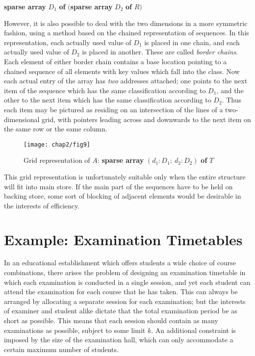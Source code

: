 \quad \textbf{sparse array} $D_1$ \textbf{of} $($\textbf{sparse array} $D_2$ \textbf{of} $R)$

However, it is also possible to deal with the two dimensions in a more symmetric fashion, using a method based on the chained representation of sequences. In this representation, each actually used value of $D_1$ is placed in one chain, and each actually used value of $D_2$ is placed in another. These are called \textit{border chains}. Each element of either border chain contains a base location pointing to a chained sequence of all elements with key values which fall into the class. Now each actual entry of the array has \textit{two} addresses attached; one points to the next item of the sequence which has the same classification according to $D_1$, and the other to the next item which has the same classification according to $D_2$. Thus each item may be pictured as residing on an intersection of the lines of a two-dimensional grid, with pointers leading across and downwards to the next item on the same row or the same column.

\begin{figure}[h]
	\centering
	\texttt{[image: chap2/fig9]}
	\caption{Grid representation of $A$: \textbf{sparse array} $(d_1: D_1;\ d_2: D_2)$ \textbf{of} $T$}
\end{figure}

This grid representation is unfortunately suitable only when the entire structure will fit into main store. If the main part of the sequences have to be held on backing store, some sort of blocking of adjacent elements would be desirable in the interests of efficiency.

\section[Example: Examination timetables]{Example: Examination Timetables}
\label{sec:example-examination}

In an educational establishment which offers students a wide choice of course combinations, there arises the problem of designing an examination timetable in which each examination is conducted in a single session, and yet each student can attend the examination for each course that he has taken. This can always be arranged by allocating a separate session for each examination; but the interests of examiner and student alike dictate that the total examination period be as short as possible. This means that each session should contain as many examinations as possible, subject to some limit $k$. An additional constraint is imposed by the size of the examination hall, which can only accommodate a certain maximum number of students.

